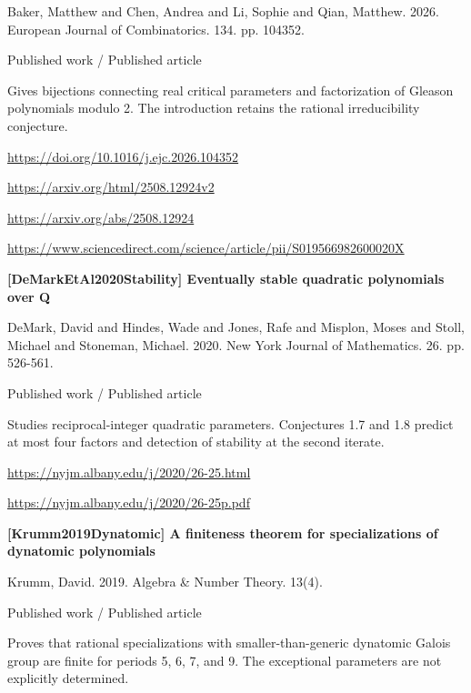 \documentclass[11pt,a4paper,oneside,openany]{book}
\begin{document}
\color{black} Baker, Matthew and Chen, Andrea and Li, Sophie and Qian, Matthew. 2026. European Journal of Combinatorics. 134. pp. 104352.\par
{\small\sffamily\color{atlasgold}Published work / Published article}\par
\color{black} Gives bijections connecting real critical parameters and factorization of Gleason polynomials modulo 2. The introduction retains the rational irreducibility conjecture.\par
{\footnotesize\url{https://doi.org/10.1016/j.ejc.2026.104352}}\par
{\footnotesize\url{https://arxiv.org/html/2508.12924v2}}\par
{\footnotesize\url{https://arxiv.org/abs/2508.12924}}\par
{\footnotesize\url{https://www.sciencedirect.com/science/article/pii/S019566982600020X}}\par
\vspace{9pt}
\hypertarget{ref:DeMarkEtAl2020Stability}{}
{\sffamily\bfseries\color{atlasgreen}[DeMarkEtAl2020Stability] Eventually stable quadratic polynomials over Q}\par
\color{black} DeMark, David and Hindes, Wade and Jones, Rafe and Misplon, Moses and Stoll, Michael and Stoneman, Michael. 2020. New York Journal of Mathematics. 26. pp. 526-561.\par
{\small\sffamily\color{atlasgold}Published work / Published article}\par
\color{black} Studies reciprocal-integer quadratic parameters. Conjectures 1.7 and 1.8 predict at most four factors and detection of stability at the second iterate.\par
{\footnotesize\url{https://nyjm.albany.edu/j/2020/26-25.html}}\par
{\footnotesize\url{https://nyjm.albany.edu/j/2020/26-25p.pdf}}\par
\vspace{9pt}
\hypertarget{ref:Krumm2019Dynatomic}{}
{\sffamily\bfseries\color{atlasgreen}[Krumm2019Dynatomic] A finiteness theorem for specializations of dynatomic polynomials}\par
\color{black} Krumm, David. 2019. Algebra \& Number Theory. 13(4).\par
{\small\sffamily\color{atlasgold}Published work / Published article}\par
\color{black} Proves that rational specializations with smaller-than-generic dynatomic Galois group are finite for periods 5, 6, 7, and 9. The exceptional parameters are not explicitly determined.\par
\end{document}
